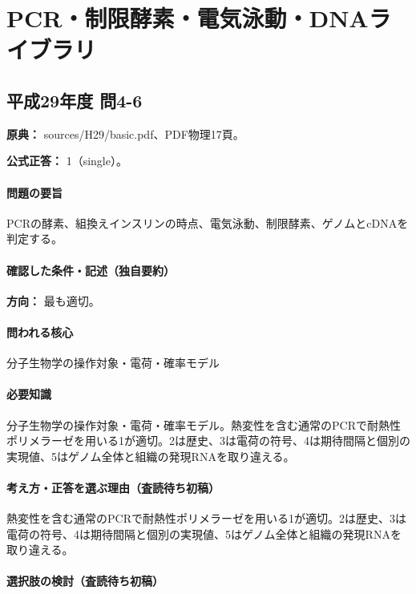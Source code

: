 \section{PCR・制限酵素・電気泳動・DNAライブラリ}

\subsection{平成29年度 問4-6}
\label{q:h29-reg-basic-4-6}

\noindent\textbf{原典：} sources/H29/basic.pdf、PDF物理17頁。

\textbf{公式正答：} 1（single）。

\paragraph{問題の要旨} PCRの酵素、組換えインスリンの時点、電気泳動、制限酵素、ゲノムとcDNAを判定する。

\paragraph{確認した条件・記述（独自要約）}\mbox{}\par

\noindent\textbf{方向：} 最も適切。\par

\paragraph{問われる核心} 分子生物学の操作対象・電荷・確率モデル

\paragraph{必要知識} 分子生物学の操作対象・電荷・確率モデル。熱変性を含む通常のPCRで耐熱性ポリメラーゼを用いる1が適切。2は歴史、3は電荷の符号、4は期待間隔と個別の実現値、5はゲノム全体と組織の発現RNAを取り違える。

\paragraph{考え方・正答を選ぶ理由（査読待ち初稿）} 熱変性を含む通常のPCRで耐熱性ポリメラーゼを用いる1が適切。2は歴史、3は電荷の符号、4は期待間隔と個別の実現値、5はゲノム全体と組織の発現RNAを取り違える。

\paragraph{選択肢の検討（査読待ち初稿）}\mbox{}\par

